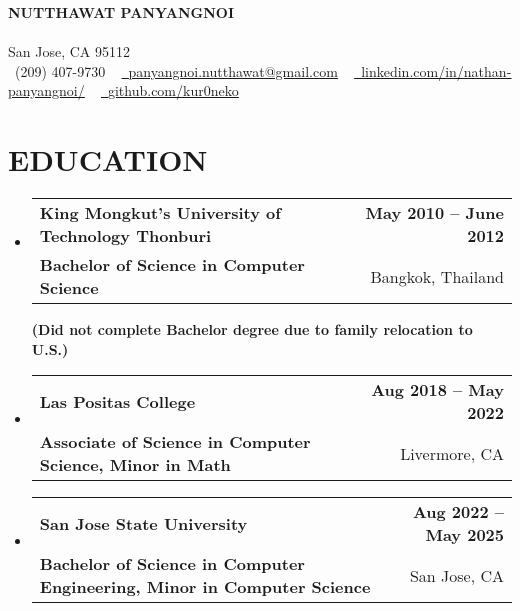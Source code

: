 \documentclass[letterpaper,11pt]{article}
\makeatletter
\newcommand{\resumeSubheading}[4]{
  \vspace{-2pt}\item
    \begin{tabular*}{1.0\textwidth}[t]{l@{\extracolsep{\fill}}r}
      \textbf{#1} & \textbf{\small #2} \\
      {\small#3} & {\small #4} \\
    \end{tabular*}\vspace{-7pt}
}
\newcommand{\resumeSubHeadingListStart}{\begin{itemize}[leftmargin=0.0in, label={}]}
\newcommand{\resumeSubHeadingListEnd}{\end{itemize}}
\makeatother
\begin{document}
\vspace{-10pt}
\begin{center}
    {\Huge \scshape\textbf {NUTTHAWAT PANYANGNOI}}\\ 
    \vspace{1pt}{https://kur0neko.com}\\ \vspace{1pt} 
    \vspace{0.5pt} San Jose, CA 95112 \\ \vspace{0.5pt}
    \small \raisebox{-0.1\height}\faPhone\ (209) 407-9730 ~ \href{mailto:panyangnoi.nutthawat@gmail.com}{\raisebox{-0.2\height}\faEnvelope\  \underline{panyangnoi.nutthawat@gmail.com}} ~ 
    \href{https://www.linkedin.com/in/nathan-panyangnoi/}{\raisebox{-0.2\height}\faLinkedin\ \underline{linkedin.com/in/nathan-panyangnoi/}}  ~
    \href{https://github.com/kur0neko}{\raisebox{-0.2\height}\faGithub\ \underline{github.com/kur0neko}}
    \vspace{-8pt}
\end{center}


\section{EDUCATION}

  \resumeSubHeadingListStart
    \resumeSubheading
      {King Mongkut’s University of Technology Thonburi}{May 2010 -- June 2012}
      {\textbf{Bachelor of Science in Computer Science}} {Bangkok, Thailand}
      \newline
      {\textbf{(Did not complete Bachelor degree due to family relocation to U.S.)} }
      \resumeSubheading
      {Las Positas College}{Aug 2018 -- May 2022}
      {\textbf{Associate of Science in Computer Science, Minor in Math}}{Livermore, CA}
    \resumeSubheading
      {San Jose State University}{Aug 2022 -- May 2025}
      {\textbf{Bachelor of Science in Computer Engineering, Minor in Computer Science}}{San Jose, CA}  
  \resumeSubHeadingListEnd

\end{document}

